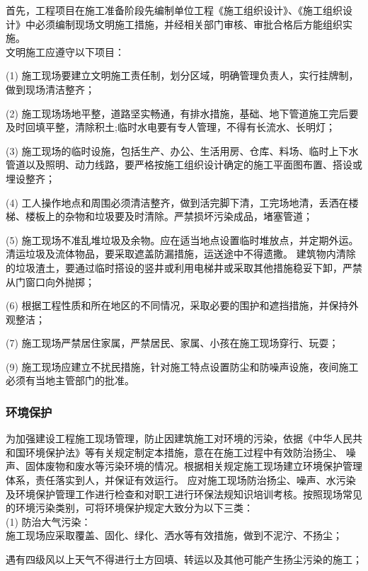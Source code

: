首先，工程项目在施工准备阶段先编制单位工程《施工组织设计》、《施工组织设计》中必须编制现场文明施工措施，并经相关部门审核、审批合格后方能组织实施。\\

文明施工应遵守以下项目：

(1) 施工现场要建立文明施工责任制，划分区域，明确管理负责人，实行挂牌制，做到现场清洁整齐；

(2) 施工现场场地平整，道路坚实畅通，有排水措施，基础、地下管道施工完后要及时回填平整，清除积土;临时水电要有专人管理，不得有长流水、长明灯；

(3) 施工现场的临时设施，包括生产、办公、生活用房、仓库、料场、临时上下水管道以及照明、动力线路，要严格按施工组织设计确定的施工平面图布置、搭设或埋设整齐；

(4) 工人操作地点和周围必须清洁整齐，做到活完脚下清，工完场地清，丢洒在楼梯、楼板上的杂物和垃圾要及时清除。严禁损坏污染成品，堵塞管道；

(5) 施工现场不准乱堆垃圾及余物。应在适当地点设置临时堆放点，并定期外运。清运垃圾及流体物品，要采取遮盖防漏措施，运送途中不得遗撒。
建筑物内清除的垃圾渣土，要通过临时搭设的竖井或利用电梯井或采取其他措施稳妥下卸，严禁从门窗口向外抛掷；

(6) 根据工程性质和所在地区的不同情况，采取必要的围护和遮挡措施，并保持外观整洁；

(7) 施工现场严禁居住家属，严禁居民、家属、小孩在施工现场穿行、玩耍；

(9) 施工现场应建立不扰民措施，针对施工特点设置防尘和防噪声设施，夜间施工必须有当地主管部门的批准。

\subsubsection{环境保护}

为加强建设工程施工现场管理，防止因建筑施工对环境的污染，依据《中华人民共和国环境保护法》等有关规定制定本措施，意在在施工过程中有效防治扬尘、
噪声、固体废物和废水等污染环境的情况。根据相关规定施工现场建立环境保护管理体系，责任落实到人，并保证有效运行。
应对施工现场防治扬尘、噪声、水污染及环境保护管理工作进行检查和对职工进行环保法规知识培训考核。按照现场常见的环境污染类别，可将环境保护规定大致分为以下三类：\\

(1) 防治大气污染：\\

 施工现场应采取覆盖、固化、绿化、洒水等有效措施，做到不泥泞、不扬尘；

 遇有四级风以上天气不得进行土方回填、转运以及其他可能产生扬尘污染的施工；

